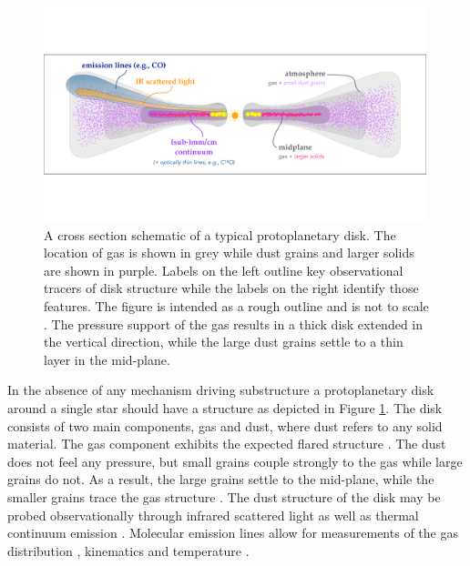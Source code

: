 \begin{figure}
    \centering
    \includegraphics[width = 0.99\textwidth]{figures/cartoon_overview.pdf}
    \caption{A cross section schematic of a typical protoplanetary disk. The location of gas is shown in grey while dust grains and larger solids are shown in purple. Labels on the left outline key observational tracers of disk structure while the labels on the right identify those features. The figure is intended as a rough outline and is not to scale \citep[see review by][]{andrews2020}. The pressure support of the gas results in a thick disk extended in the vertical direction, while the large dust grains settle to a thin layer in the mid-plane.}
    \label{fig:struct_cartoon}
\end{figure}

In the absence of any mechanism driving substructure a protoplanetary disk around a single star should have a structure as depicted in Figure \ref{fig:struct_cartoon}. 
The disk consists of two main components, gas and dust, where dust refers to any solid material. 
The gas component exhibits the expected flared structure \citep{kenyon1987}. 
The dust does not feel any pressure, but small grains couple strongly to the gas while large grains do not. 
As a result, the large grains settle to the mid-plane, while the smaller grains trace the gas structure \citep{nakagawa1986}.
The dust structure of the disk may be probed observationally through infrared scattered light as well as thermal continuum emission \citep{almapartnership2015,andrews2016,ansdell2016}. 
Molecular emission lines allow for measurements of the gas distribution \citep{vandermarel2015,ansdell2016,zhang2021}, kinematics \citep{perez2015,pinte2018a,teague2018,pinte2019,yu2021,calcino2022} and temperature \citep{pinte2018,calahan2021}.


